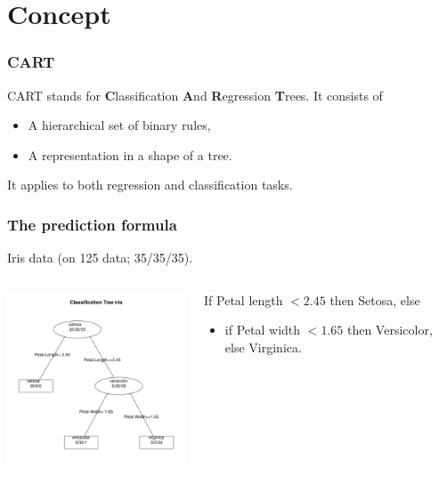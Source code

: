\section{Concept}
\begin{frame}
\frametitle{CART}
CART stands for {\bf C}lassification {\bf A}nd {\bf R}egression {\bf T}rees. It consists of 
\begin{itemize}
\item A hierarchical set of binary rules,
\item A representation in a shape of a tree.
\end{itemize}
It applies to both regression and classification tasks.
\end{frame}
\begin{frame}
\frametitle{The prediction formula}
Iris data (on 125 data; 35/35/35).
\begin{columns}
\begin{column}{0.5\textwidth}
\begin{center}
\includegraphics[width=6.5cm]{../../Graphs/IRIS_CART.png}
\end{center}
\end{column}
\begin{column}{0.5\textwidth}
\small
If Petal length $< 2.45$ then Setosa, else
\begin{itemize}
\item if Petal width $< 1.65$ then Versicolor, else Virginica.
\end{itemize}
\end{column}
\end{columns}
\end{frame}
